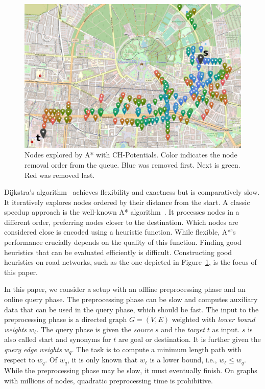 \documentclass[a4paper,USenglish,cleveref, autoref, thm-restate]{lipics-v2019}
\begin{document}
\begin{figure}

\centering
\includegraphics[width=\columnwidth]{fig/searchspace_st.png}


\caption{Nodes explored by A* with CH-Potentials. Color indicates the node removal order from the queue. Blue was removed first. Next is green. Red was removed last.}
\label{img:search-space}
\end{figure}


Dijkstra's algorithm~\cite{d-ntpcg-59} achieves flexibility and exactness but is comparatively slow.
It iteratively explores nodes ordered by their distance from the start.
A classic speedup approach is the well-known A* algorithm~\cite{hnr-afbhd-68}.
It processes nodes in a different order, preferring nodes closer to the destination.
Which nodes are considered close is encoded using a heuristic function.
While flexible, A*'s performance crucially depends on the quality of this function.
Finding good heuristics that can be evaluated efficiently is difficult.
Constructing good heuristics on road networks, such as the one depicted in Figure~\ref{img:search-space}, is the focus of this paper.

In this paper, we consider a setup with an offline preprocessing phase and an online query phase.
The preprocessing phase can be slow and computes auxiliary data that can be used in the query phase, which should be fast.
The input to the preprocessing phase is a directed graph $G=(V,E)$ weighted with \emph{lower bound weights} $w_\ell$.
The query phase is given the \emph{source} $s$ and the \emph{target} $t$ as input.
$s$ is also called start and synonyms for $t$ are goal or destination.
It is further given the \emph{query edge weights} $w_q$.
The task is to compute a minimum length path with respect to $w_q$.
Of $w_q$, it is only known that $w_\ell$ is a lower bound, i.e., $w_\ell \le w_q$.
%
While the preprocessing phase may be slow, it must eventually finish.
On graphs with millions of nodes, quadratic preprocessing time is prohibitive.
\end{document}
